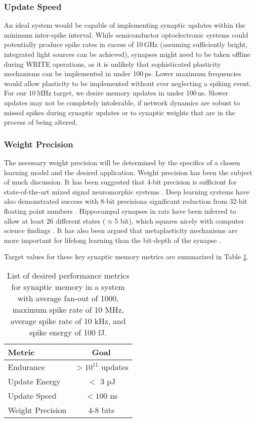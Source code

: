 \documentclass[twocolumn]{article}
\begin{document}
\subsubsection{Update Speed}
An ideal system would be capable of implementing synaptic updates within the minimum inter-spike interval. While semiconductor optoelectronic systems could potentially produce spike rates in excess of 10\,GHz (assuming sufficiently bright, integrated light sources can be achieved), synapses might need to be taken offline during WRITE operations, as it is unlikely that sophisticated plasticity mechanisms can be implemented in under 100\,ps. Lower maximum frequencies would allow plasticity to be implemented without ever neglecting a spiking event. For our 10\,MHz target, we desire memory updates in under 100\,ns. Slower updates may not be completely intolerable, if network dynamics are robust to missed spikes during synaptic updates or to synaptic weights that are in the process of being altered.

\subsubsection{Weight Precision}
The necessary weight precision will be determined by the specifics of a chosen learning model and the desired application. Weight precision has been the subject of much discussion. It has been suggested that 4-bit precision is sufficient for state-of-the-art mixed signal neuromorphic systems \cite{pfeil20124}. Deep learning systems have also demonstrated success with 8-bit precision\textemdash a significant reduction from 32-bit floating point numbers \cite{wang2018training}. Hippocampal synapses in rats have been inferred to allow at least 26 different states ($\approx 5$ bit), which squares nicely with computer science findings \cite{bartol2015nanoconnectomic}. It has also been argued that metaplasticity mechanisms are more important for lifelong learning than the bit-depth of the synapse \cite{fudr2005,fuab2007}.

Target values for these key synaptic memory metrics are summarized in Table \ref{tab:memory_metrics}.

\begin{table}[h!]
  \begin{center}
    \label{tab:memory_metrics}
    \renewcommand{\arraystretch}{1.5}
    \begin{tabular}{l|c} %
      \textbf{Metric} & \textbf{Goal} \\
      \hline
      Endurance & $>10^{11}$ updates \\
      Update Energy & $<$ 3 pJ\\
      Update Speed & $<100$ ns \\
      Weight Precision & 4-8 bits
      
    \end{tabular}
    \caption{List of desired performance metrics for synaptic memory in a system with average fan-out of 1000, maximum spike rate of 10 MHz, average spike rate of 10 kHz, and spike energy of 100 fJ.}
  \end{center}
\end{table}
\end{document}
